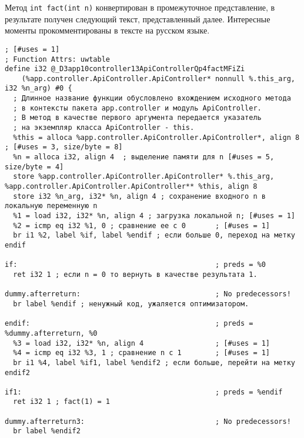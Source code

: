 \documentclass{studrep}
\begin{document}
Метод \verb-int fact(int n)- конвертирован в промежуточное представление, в результате получен следующий текст, представленный далее.  Интересные моменты прокомментированы в тексте на русском языке.

\begin{verbatim}
; [#uses = 1]
; Function Attrs: uwtable
define i32 @_D3app10controller13ApiControllerQp4factMFiZi
    (%app.controller.ApiController.ApiController* nonnull %.this_arg, i32 %n_arg) #0 {
  ; Длинное название функции обусловлено вхождением исходного метода
  ; в контексты пакета app.controller и модуль ApiController.
  ; В метод в качестве первого аргумента передается указатель
  ; на экземпляр класса ApiController - this.
  %this = alloca %app.controller.ApiController.ApiController*, align 8 ; [#uses = 3, size/byte = 8]
  %n = alloca i32, align 4  ; выделение памяти для n [#uses = 5, size/byte = 4]
  store %app.controller.ApiController.ApiController* %.this_arg, %app.controller.ApiController.ApiController** %this, align 8
  store i32 %n_arg, i32* %n, align 4 ; сохранение входного n в локальную переменную n
  %1 = load i32, i32* %n, align 4 ; загрузка локальной n; [#uses = 1]
  %2 = icmp eq i32 %1, 0 ; сравнение ее с 0       ; [#uses = 1]
  br i1 %2, label %if, label %endif ; если больше 0, переход на метку endif

if:                                               ; preds = %0
  ret i32 1 ; если n = 0 то вернуть в качестве результата 1.

dummy.afterreturn:                                ; No predecessors!
  br label %endif ; ненужный код, ужаляется оптимизатором.

endif:                                            ; preds = %dummy.afterreturn, %0
  %3 = load i32, i32* %n, align 4                 ; [#uses = 1]
  %4 = icmp eq i32 %3, 1 ; сравнение n с 1        ; [#uses = 1]
  br i1 %4, label %if1, label %endif2 ; если больше, перейти на метку endif2

if1:                                              ; preds = %endif
  ret i32 1 ; fact(1) = 1

dummy.afterreturn3:                               ; No predecessors!
  br label %endif2


\end{verbatim}
\end{document}
